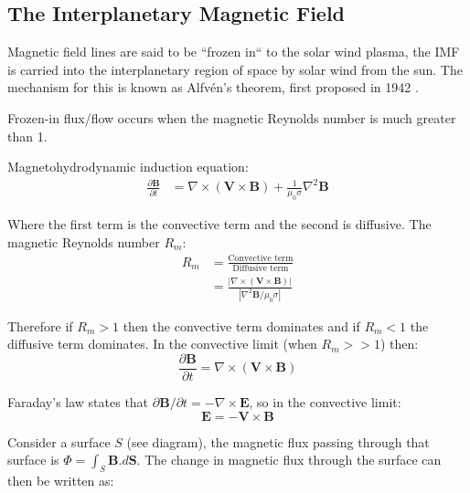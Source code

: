 \documentclass[12pt]{article}
\newcommand{\incfig}[2][1]{
    \def\svgwidth{#1\textwidth}
    
}
\begin{document}
\subsection{The Interplanetary Magnetic Field}
Magnetic field lines are said to be ``frozen in`` to the solar wind plasma, the IMF is carried into the interplanetary region of space by solar wind from the sun. The mechanism for this is known as Alfvén's theorem, first proposed in 1942 \cite{alfven_1942}. 

Frozen-in flux/flow occurs when the magnetic Reynolds number is much greater than 1.

Magnetohydrodynamic induction equation:
\begin{align}
    \frac{\partial \textbf{B}}{\partial t} &= \nabla \times (\textbf{V}\times\textbf{B})+\frac{1}{\mu_0\sigma}\nabla^2\textbf{B}
\end{align}

Where the first term is the convective term and the second is diffusive. The magnetic Reynolds number $R_m$:
\begin{align}
    R_m&=\frac{\text{Convective term}}{\text{Diffusive term}} \nonumber\\
    &=\frac{|\nabla\times(\textbf{V}\times\textbf{B})|}{|\nabla^2\textbf{B}/\mu_0\sigma|}
\end{align}

Therefore if $R_m>1$ then the convective term dominates and if $R_m<1$ the diffusive term dominates. In the convective limit (when $R_m>>1$) then:
\begin{equation}
    \frac{\partial\textbf{B}}{\partial t}=\nabla\times(\textbf{V}\times\textbf{B})
    \label{eq:convLim}
\end{equation}

Faraday's law states that $\partial\textbf{B}/\partial t=-\nabla\times\textbf{E}$, so in the convective limit:
\begin{equation}
    \textbf{E}=-\textbf{V}\times\textbf{B}
\end{equation}

\begin{figure}
    \hspace{1.5cm}
    \vspace{-5mm}
    \incfig[0.38]{frozen-in}
    \vspace{5mm}
\end{figure}

Consider a surface $S$ (see diagram), the magnetic flux passing through that surface is $\Phi=\int_S\textbf{B}.d\textbf{S}$. The change in magnetic flux through the surface can then be written as:
\end{document}
